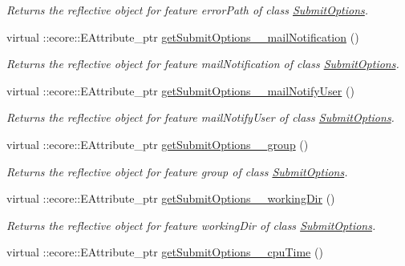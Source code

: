 \begin{DoxyCompactItemize}
\begin{DoxyCompactList}\small\item\em Returns the reflective object for feature errorPath of class \hyperlink{classTMS__Data_1_1SubmitOptions}{SubmitOptions}. \item\end{DoxyCompactList}\item 
virtual ::ecore::EAttribute\_\-ptr \hyperlink{classTMS__Data_1_1TMS__DataPackage_afce77f9cc5d9f920f10faf3cd87fbf43}{getSubmitOptions\_\-\_\-mailNotification} ()
\begin{DoxyCompactList}\small\item\em Returns the reflective object for feature mailNotification of class \hyperlink{classTMS__Data_1_1SubmitOptions}{SubmitOptions}. \item\end{DoxyCompactList}\item 
virtual ::ecore::EAttribute\_\-ptr \hyperlink{classTMS__Data_1_1TMS__DataPackage_a4c5f2b8e0c3a987da6717c64db23df57}{getSubmitOptions\_\-\_\-mailNotifyUser} ()
\begin{DoxyCompactList}\small\item\em Returns the reflective object for feature mailNotifyUser of class \hyperlink{classTMS__Data_1_1SubmitOptions}{SubmitOptions}. \item\end{DoxyCompactList}\item 
virtual ::ecore::EAttribute\_\-ptr \hyperlink{classTMS__Data_1_1TMS__DataPackage_ab332f59c98aa76f38969a907fe3a63ad}{getSubmitOptions\_\-\_\-group} ()
\begin{DoxyCompactList}\small\item\em Returns the reflective object for feature group of class \hyperlink{classTMS__Data_1_1SubmitOptions}{SubmitOptions}. \item\end{DoxyCompactList}\item 
virtual ::ecore::EAttribute\_\-ptr \hyperlink{classTMS__Data_1_1TMS__DataPackage_aa3fdf9f8b5d074295219517e1edc21e7}{getSubmitOptions\_\-\_\-workingDir} ()
\begin{DoxyCompactList}\small\item\em Returns the reflective object for feature workingDir of class \hyperlink{classTMS__Data_1_1SubmitOptions}{SubmitOptions}. \item\end{DoxyCompactList}\item 
virtual ::ecore::EAttribute\_\-ptr \hyperlink{classTMS__Data_1_1TMS__DataPackage_a34888598073993a05bcc786b67a84272}{getSubmitOptions\_\-\_\-cpuTime} ()

\end{DoxyCompactItemize}
